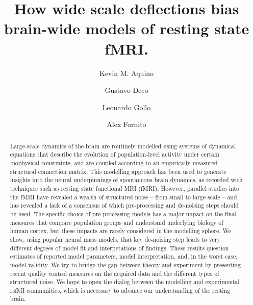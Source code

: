 \documentclass[oneside]{zHenriquesLab-StyleBioRxiv}
\begin{document}
\title{How wide scale deflections bias brain-wide models of resting state fMRI.}

\author[1,*]{Kevin M. Aquino}
\author[1,2]{Gustavo Deco}
\author[1]{Leonardo Gollo}
\author[1]{Alex Fornito}



\maketitle

\begin{abstract}
Large-scale dynamics of the brain are routinely modelled using systems of dynamical equations that describe the evolution of population-level activity under certain biophysical constraints, and are coupled according to an empirically measured structural connection matrix. This modelling approach has been used to generate insights into the neural underpinnings of spontaneous brain dynamics, as recorded with techniques such as resting state functional MRI (fMRI).
However, parallel studies into the fMRI have revealed a wealth of structured noise – from small to large scale – and has revealed a lack of a consensus of which pre-processing and de-noising steps should be used. 
The specific choice of pre-processing models has a major impact on the final measures that compare population groups and understand underlying biology of human cortex, but these impacts are rarely considered in the modelling sphere. 
We show, using popular neural mass models, that key de-noising step leads to very different degrees of model fit and interpetations of findings.
These results question estimates of reported model parameters, model interpretation, and, in the worst case, model validity. 
We try to bridge the gap between theory and experiment by presenting recent quality control measures on the acquired data and the different types of structured noise. 
We hope to open the dialog between the modelling and experimental rsfMI communities, which is necessary to advance our understanding of the resting brain.
\end{abstract}
\end{document}
